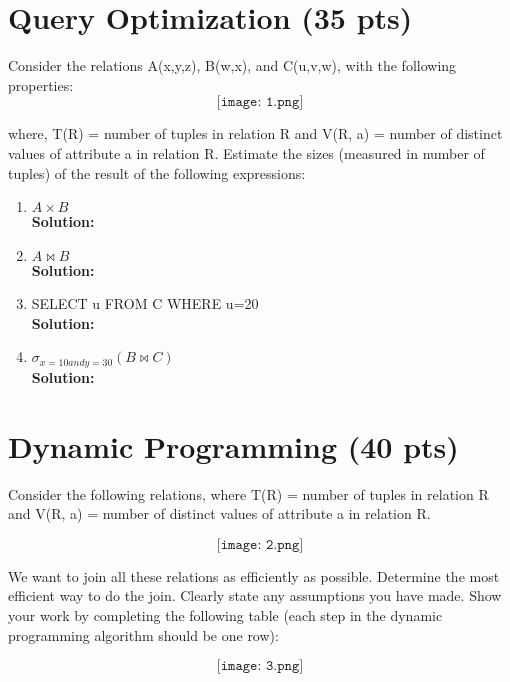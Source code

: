\documentclass[paper=a4, fontsize=11pt]{scrartcl}
\numberwithin{equation}{section}		%
\numberwithin{figure}{section}			%
\numberwithin{table}{section}				%
\begin{document}
\section{Query Optimization (35 pts)}

Consider the relations A(x,y,z), B(w,x), and C(u,v,w), with the following properties:
\[
\texttt{[image: 1.png]}
\]

where, T(R) = number of tuples in relation R and V(R, a) = number of distinct values of attribute a in relation R. Estimate the sizes (measured in number of tuples) of the result of the following expressions:

\begin{enumerate}
	\item $A \times B$\\
	\textbf{Solution: }


	\item $A \bowtie B$\\
	\textbf{Solution: }


	\item SELECT u FROM C WHERE u=20\\
	\textbf{Solution: }
    
    \item $\sigma_{x = 10 and y=30}(B \bowtie C)$\\
	\textbf{Solution: }


\end{enumerate}


\section{Dynamic Programming (40 pts)}

Consider the following relations, where T(R) = number of tuples in relation R and V(R, a) = number of distinct values of attribute a in relation R.

\[
\texttt{[image: 2.png]}
\]

We want to join all these relations as efficiently as possible. Determine the most efficient way to do the join. Clearly state any assumptions you have made. Show your work by completing the following table (each step in the dynamic programming algorithm should be one row):


\[
\texttt{[image: 3.png]}
\]







\end{document}
